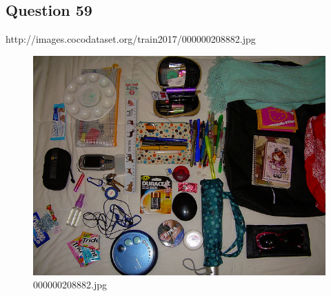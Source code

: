 \subsection*{Question 59}
http://images.cocodataset.org/train2017/000000208882.jpg
\begin{figure}[h]
    \centering
    \includegraphics[width=0.8\linewidth]{../image set/hard/000000208882.jpg}
    \caption{000000208882.jpg}
\end{figure}
